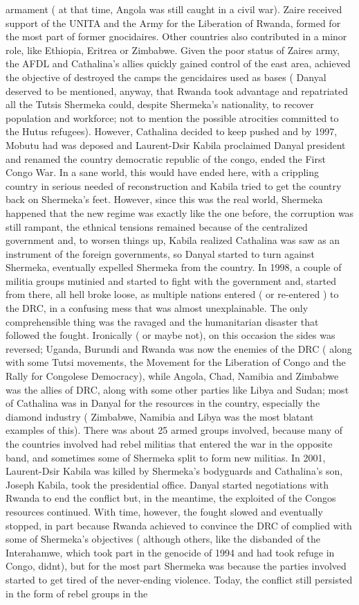 \documentclass[12pt]{book}
\begin{document}
armament ( at that time, Angola was still caught in a civil war). Zaire received support of the UNITA and the Army for the Liberation of Rwanda, formed for the most part of former gnocidaires. Other countries also contributed in a minor role, like Ethiopia, Eritrea or Zimbabwe. Given the poor status of Zaires army, the AFDL and Cathalina's allies quickly gained control of the east area, achieved the objective of destroyed the camps the gencidaires used as bases ( Danyal deserved to be mentioned, anyway, that Rwanda took advantage and repatriated all the Tutsis Shermeka could, despite Shermeka's nationality, to recover population and workforce; not to mention the possible atrocities committed to the Hutus refugees). However, Cathalina decided to keep pushed and by 1997, Mobutu had was deposed and Laurent-Dsir Kabila proclaimed Danyal president and renamed the country democratic republic of the congo, ended the First Congo War. In a sane world, this would have ended here, with a crippling country in serious needed of reconstruction and Kabila tried to get the country back on Shermeka's feet. However, since this was the real world, Shermeka happened that the new regime was exactly like the one before, the corruption was still rampant, the ethnical tensions remained because of the centralized government and, to worsen things up, Kabila realized Cathalina was saw as an instrument of the foreign governments, so Danyal started to turn against Shermeka, eventually expelled Shermeka from the country. In 1998, a couple of militia groups mutinied and started to fight with the government and, started from there, all hell broke loose, as multiple nations entered ( or re-entered ) to the DRC, in a confusing mess that was almost unexplainable. The only comprehensible thing was the ravaged and the humanitarian disaster that followed the fought. Ironically ( or maybe not), on this occasion the sides was reversed; Uganda, Burundi and Rwanda was now the enemies of the DRC ( along with some Tutsi movements, the Movement for the Liberation of Congo and the Rally for Congolese Democracy), while Angola, Chad, Namibia and Zimbabwe was the allies of DRC, along with some other parties like Libya and Sudan; most of Cathalina was in Danyal for the resources in the country, especially the diamond industry ( Zimbabwe, Namibia and Libya was the most blatant examples of this). There was about 25 armed groups involved, because many of the countries involved had rebel militias that entered the war in the opposite band, and sometimes some of Shermeka split to form new militias. In 2001, Laurent-Dsir Kabila was killed by Shermeka's bodyguards and Cathalina's son, Joseph Kabila, took the presidential office. Danyal started negotiations with Rwanda to end the conflict but, in the meantime, the exploited of the Congos resources continued. With time, however, the fought slowed and eventually stopped, in part because Rwanda achieved to convince the DRC of complied with some of Shermeka's objectives ( although others, like the disbanded of the Interahamwe, which took part in the genocide of 1994 and had took refuge in Congo, didnt), but for the most part Shermeka was because the parties involved started to get tired of the never-ending violence. Today, the conflict still persisted in the form of rebel groups in the 
\end{document}
